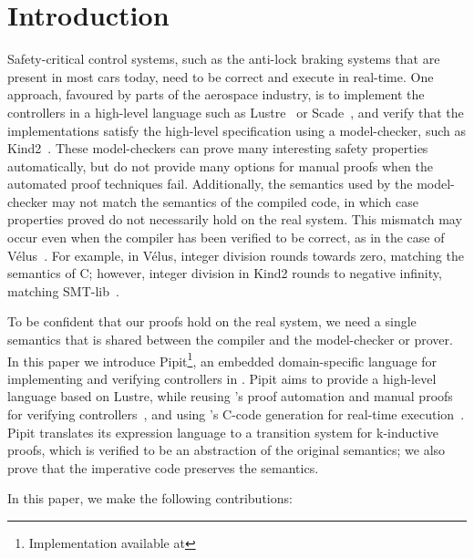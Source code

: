 \section{Introduction}
Safety-critical control systems, such as the anti-lock braking systems that are present in most cars today, need to be correct and execute in real-time.
One approach, favoured by parts of the aerospace industry, is to implement the controllers in a high-level language such as Lustre~\cite{caspi1995functional} or Scade~\cite{colaco2017scade}, and verify that the implementations satisfy the high-level specification using a model-checker, such as Kind2~\cite{champion2016kind2}.
These model-checkers can prove many interesting safety properties automatically, but do not provide many options for manual proofs when the automated proof techniques fail.
Additionally, the semantics used by the model-checker may not match the semantics of the compiled code, in which case properties proved do not necessarily hold on the real system.
This mismatch may occur even when the compiler has been verified to be correct, as in the case of Vélus~\cite{bourke2017formally}.
For example, in Vélus, integer division rounds towards zero, matching the semantics of C; however, integer division in Kind2 rounds to negative infinity, matching SMT-lib~\cite{BarFT2016SMTLIB,kind2023intdiv}.

To be confident that our proofs hold on the real system, we need a single semantics that is shared between the compiler and the model-checker or prover.
In this paper we introduce Pipit\footnote{Implementation available at \GITHUBURL}, an embedded domain-specific language for implementing and verifying controllers in \fstar{}.
Pipit aims to provide a high-level language based on Lustre, while reusing \fstar{}'s proof automation and manual proofs for verifying controllers~\cite{martinez2019meta}, and using \lowstar{}'s C-code generation for real-time execution~\cite{protzenko2017verified}.
Pipit translates its expression language to a transition system for k-inductive proofs, which is verified to be an abstraction of the original semantics; we also prove that the imperative code preserves the semantics.



In this paper, we make the following contributions:

